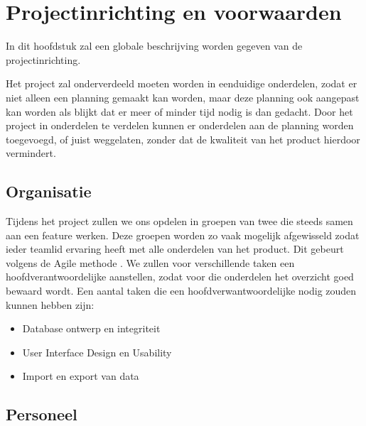 \section{Projectinrichting en voorwaarden}
\label{projectinrichting}

In dit hoofdstuk zal een globale beschrijving worden gegeven van de projectinrichting. 

Het project zal onderverdeeld moeten worden in eenduidige onderdelen, zodat er niet alleen een planning gemaakt kan worden,
maar deze planning ook aangepast kan worden als blijkt dat er meer of minder tijd nodig is dan gedacht.
Door het project in onderdelen te verdelen kunnen er onderdelen aan de planning worden toegevoegd,
of juist weggelaten, zonder dat de kwaliteit van het product hierdoor vermindert.


\subsection{Organisatie}

Tijdens het project zullen we ons opdelen in groepen van twee die steeds samen aan een feature werken.
Deze groepen worden zo vaak mogelijk afgewisseld zodat ieder teamlid ervaring heeft met alle onderdelen van het product. Dit gebeurt volgens de Agile methode \cite{wiki:agile}.
We zullen voor verschillende taken een hoofdverantwoordelijke aanstellen, zodat voor die onderdelen het overzicht goed bewaard wordt.
Een aantal taken die een hoofdverwantwoordelijke nodig zouden kunnen hebben zijn:
\begin{itemize}
    \item Database ontwerp en integriteit
    \item User Interface Design en Usability
    \item Import en export van data
\end{itemize}


\subsection{Personeel}

